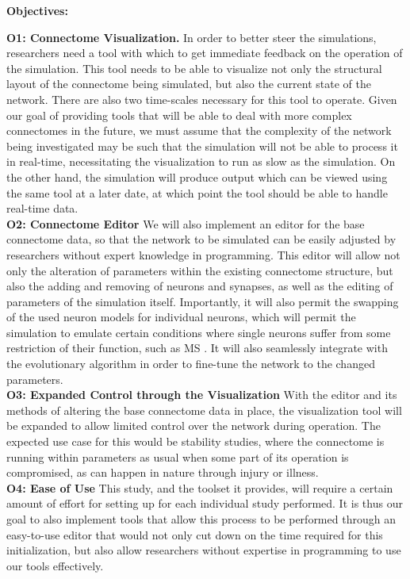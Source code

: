 \documentclass[a4paper,11pt]{article}
\begin{document}
\textbf{Objectives:}

\textbf{O1: Connectome Visualization.}
In order to better steer the simulations, researchers need a tool with which to get immediate feedback on the operation of the simulation. This tool needs to be able to visualize not only the structural layout of the connectome being simulated, but also the current state of the network.
There are also two time-scales necessary for this tool to operate. Given our goal of providing tools that will be able to deal with more complex connectomes in the future, we must assume that the complexity of the network being investigated may be such that the simulation will not be able to process it in real-time, necessitating the visualization to run as slow as the simulation. On the other hand, the simulation will produce output which can be viewed using the same tool at a later date, at which point the tool should be able to handle real-time data.
\\[0,2cm]

\textbf{O2: Connectome Editor} 
We will also implement an editor for the base connectome data, so that the network to be simulated can be easily adjusted by researchers without expert knowledge in programming. This editor will allow not only the alteration of parameters within the existing connectome structure, but also the adding and removing of neurons and synapses, as well as the editing of parameters of the simulation itself. Importantly, it will also permit the swapping of the used neuron models for individual neurons, which will permit the simulation to emulate certain conditions where single neurons suffer from some restriction of their function, such as MS \citep{Hauser2006}. It will also seamlessly integrate with the evolutionary algorithm in order to fine-tune the network to the changed parameters.
\\[0,2cm]

\textbf{O3: Expanded Control through the Visualization}
With the editor and its methods of altering the base connectome data in place, the visualization tool will be expanded to allow limited control over the network during operation. The expected use case for this would be stability studies, where the connectome is running within parameters as usual when some part of its operation is compromised, as can happen in nature through injury or illness.
\\[0,2cm]

\textbf{O4: Ease of Use}
This study, and the toolset it provides, will require a certain amount of effort for setting up for each individual study performed. It is thus our goal to also implement tools that allow this process to be performed through an easy-to-use editor that would not only cut down on the time required for this initialization, but also allow researchers without expertise in programming to use our tools effectively. 
\\[0,2cm]
\end{document}
